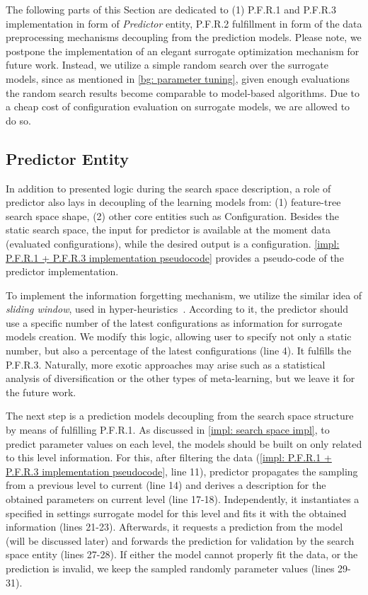 The following parts of this Section are dedicated to (1) P.F.R.1 and P.F.R.3 implementation in form of \emph{Predictor} entity, P.F.R.2 fulfillment in form of the data preprocessing mechanisms decoupling from the prediction models. Please note, we postpone the implementation of an elegant surrogate optimization mechanism for future work. Instead, we utilize a simple random search over the surrogate models, since as mentioned in \cref{bg: parameter tuning}, given enough evaluations the random search results become comparable to model-based algorithms. Due to a cheap cost of configuration evaluation on surrogate models, we are allowed to do so.

\subsection{Predictor Entity}
In addition to presented logic during the search space description, a role of predictor also lays in decoupling of the learning models from: (1) feature-tree search space shape, (2) other core entities such as Configuration. Besides the static search space, the input for predictor is available at the moment data (evaluated configurations), while the desired output is a configuration. \cref{impl: P.F.R.1 + P.F.R.3 implementation pseudocode} provides a pseudo-code of the predictor implementation.

To implement the information forgetting mechanism, we utilize the similar idea of \emph{sliding window}, used in hyper-heuristics~\cite{ferreira2017multi}. According to it, the predictor should use a specific number of the latest configurations as information for surrogate models creation. We modify this logic, allowing user to specify not only a static number, but also a percentage of the latest configurations (line 4). It fulfills the P.F.R.3. Naturally, more exotic approaches may arise such as a statistical analysis of diversification or the other types of meta-learning, but we leave it for the future work.

The next step is a prediction models decoupling from the search space structure by means of fulfilling P.F.R.1. As discussed in \cref{impl: search space impl}, to predict parameter values on each level, the models should be built on only related to this level information. For this, after filtering the data (\cref{impl: P.F.R.1 + P.F.R.3 implementation pseudocode}, line 11), predictor propagates the sampling from a previous level to current (line 14) and derives a description for the obtained parameters on current level (line 17-18). Independently, it instantiates a specified in settings surrogate model for this level and fits it with the obtained information (lines 21-23). Afterwards, it requests a prediction from the model (will be discussed later) and forwards the prediction for validation by the search space entity (lines 27-28). If either the model cannot properly fit the data, or the prediction is invalid, we keep the sampled randomly parameter values (lines 29-31).

